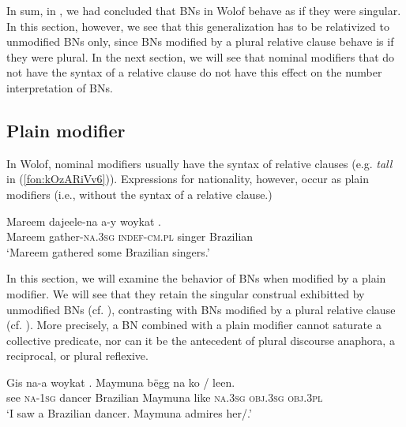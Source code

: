 \documentclass[output=paper]{langscibook}
\begin{document}
\noindent In sum, in , we had concluded that BNs in Wolof behave as if they were singular. In this section, however, we see that this generalization has to be relativized to unmodified BNs only, since BNs modified by a plural relative clause behave is if they were plural. In the next section, we will see that nominal modifiers that do not have the syntax of a relative clause do not have this effect on the number interpretation of BNs.

\subsection{Plain modifier}
\label{fon:sec:BreZ}

In Wolof, nominal modifiers usually have the syntax of relative clauses (e.g. \textit{tall} in (\ref{fon:kOzARiVv6})). Expressions for nationality, however, occur as plain modifiers (i.e., without the syntax of a relative clause.)
		
		\ea \gll	Mareem dajeele-na a-y woykat .\\
				Mareem gather-\textsc{na.3sg} \textsc{indef-cm.pl} singer Brazilian\\
				\glt `Mareem gathered some Brazilian singers.'\label{fon:gEntToRrRSeAa3}
		\z
		
	
	
	\noindent In this section, we will examine the behavior of BNs when modified by a plain modifier. We will see that they retain the singular construal exhibitted by unmodified BNs (cf. ), contrasting with BNs modified by a plural relative clause (cf. ). More precisely, a BN combined with a plain modifier cannot saturate a collective predicate, nor can it be the antecedent of plural discourse anaphora, a reciprocal, or plural reflexive.
	
		
		
			\label{fon:pLEjNBrZl}
		\z
		
		\ea \gll Gis na-a {woykat} . Maymuna b\"{e}gg na ko / \minsp{*} leen.\\
				see \textsc{na-1sg} dancer Brazilian Maymuna like \textsc{na.3sg} \textsc{obj.3sg} {} {} \textsc{obj.3pl}\\
				\glt `I saw a Brazilian dancer. Maymuna admires her/.'
		\z
	
\end{document}
